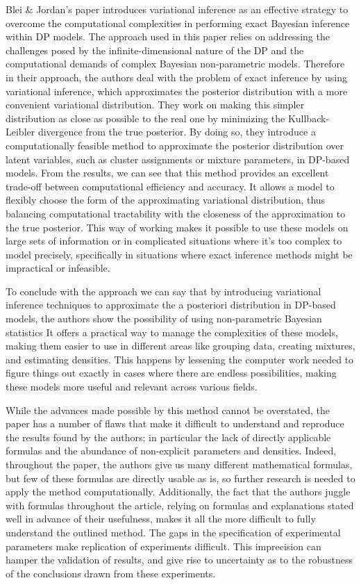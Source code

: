 \documentclass{article}
\begin{document}
Blei \& Jordan's paper introduces variational inference as an effective strategy to overcome the computational complexities in performing exact Bayesian inference within DP models. The approach used in this paper relies on addressing the challenges posed by the infinite-dimensional nature of the DP and the computational demands of complex Bayesian non-parametric models. Therefore in their approach, the authors deal with the problem of exact inference by using variational inference, which approximates the posterior distribution with a more convenient variational distribution. They work on making this simpler distribution as close as possible to the real one by minimizing the Kullback-Leibler divergence from the true posterior. By doing so, they introduce a computationally feasible method to approximate the posterior distribution over latent variables, such as cluster assignments or mixture parameters, in DP-based models. From the results, we can see that this method provides an excellent trade-off between computational efficiency and accuracy. It allows a model to flexibly choose the form of the approximating variational distribution, thus balancing computational tractability with the closeness of the approximation to the true posterior. This way of working makes it possible to use these models on large sets of information or in complicated situations where it's too complex to model precisely, specifically in situations where exact inference methods might be impractical or infeasible. 

To conclude with the approach we can say that by introducing variational inference techniques to approximate the a posteriori distribution in DP-based models, the authors show the possibility of using non-parametric Bayesian statistics It offers a practical way to manage the complexities of these models, making them easier to use in different areas like grouping data, creating mixtures, and estimating densities. This happens by lessening the computer work needed to figure things out exactly in cases where there are endless possibilities, making these models more useful and relevant across various fields.

While the advances made possible by this method cannot be overstated, the paper has a number of flaws that make it difficult to understand and reproduce the results found by the authors; in particular the lack of directly applicable formulas and the abundance of non-explicit parameters and densities. Indeed, throughout the paper, the authors give us many different mathematical formulas, but few of these formulas are directly usable as is, so further research is needed to apply the method computationally. Additionally, the fact that the authors juggle with formulas throughout the article, relying on formulas and explanations stated well in advance of their usefulness, makes it all the more difficult to fully understand the outlined method. The gaps in the specification of experimental parameters make replication of experiments difficult. This imprecision can hamper the validation of results, and give rise to uncertainty as to the robustness of the conclusions drawn from these experiments. 
\end{document}

